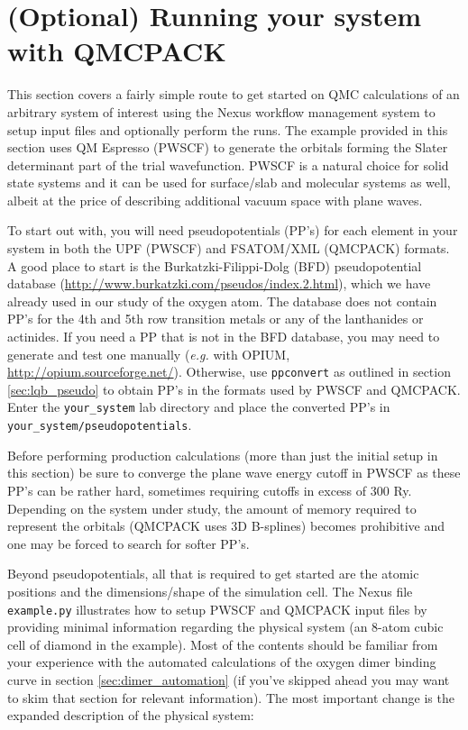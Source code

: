 \section{(Optional) Running your system with QMCPACK}\label{sec:your_system}
This section covers a fairly simple route to get started on QMC calculations of an arbitrary system of interest using the Nexus workflow management system to setup input files and optionally perform the runs.  The example provided in this section uses QM Espresso (PWSCF) to generate the orbitals forming the Slater determinant part of the trial wavefunction.  PWSCF is a natural choice for solid state systems and it can be used for surface/slab and molecular systems as well, albeit at the price of describing additional vacuum space with plane waves.

To start out with, you will need pseudopotentials (PP's) for each element in your system in both the UPF (PWSCF) and FSATOM/XML (QMCPACK) formats.  A good place to start is the Burkatzki-Filippi-Dolg (BFD) pseudopotential database \newline (\href{http://www.burkatzki.com/pseudos/index.2.html}{http://www.burkatzki.com/pseudos/index.2.html}), which we have already used in our study of the oxygen atom.  The database does not contain PP's for the 4th and 5th row transition metals or any of the lanthanides or actinides.  If you need a PP that is not in the BFD database, you may need to generate and test one manually (\emph{e.g.} with OPIUM, \href{http://opium.sourceforge.net/}{http://opium.sourceforge.net/}).  Otherwise, use \texttt{ppconvert} as outlined in section \ref{sec:lqb_pseudo} to obtain PP's in the formats used by PWSCF and QMCPACK.  Enter the \texttt{your\_system} lab directory and place the converted PP's in \texttt{your\_system/pseudopotentials}.

Before performing production calculations (more than just the initial setup in this section) be sure to converge the plane wave energy cutoff in PWSCF as these PP's can be rather hard, sometimes requiring cutoffs in excess of 300 Ry.  Depending on the system under study, the amount of memory required to represent the orbitals (QMCPACK uses 3D B-splines) becomes prohibitive and one may be forced to search for softer PP's.

Beyond pseudopotentials, all that is required to get started are the atomic positions and the dimensions/shape of the simulation cell.  The Nexus file \texttt{example.py} illustrates how to setup PWSCF and QMCPACK input files by providing minimal information regarding the physical system (an 8-atom cubic cell of diamond in the example).  Most of the contents should be familiar from your experience with the automated calculations of the oxygen dimer binding curve in section \ref{sec:dimer_automation} (if you've skipped ahead you may want to skim that section for relevant information).  The most important change is the expanded description of the physical system:

